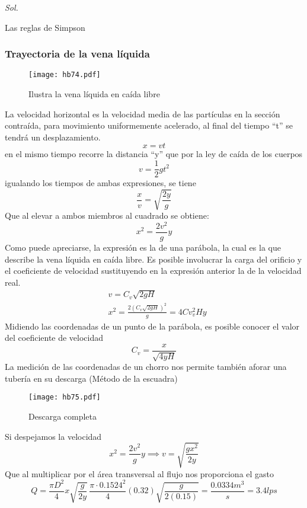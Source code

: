 \textit{ Sol. }

Las reglas de Simpson



\subsubsection{Trayectoria de la vena líquida}
\begin{figure}[h!]
\centering
  \texttt{[image: hb74.pdf]}
  \caption{Ilustra la vena líquida en caída libre}
  \label{hb74}
\end{figure}
La velocidad horizontal es la velocidad media de las partículas en la sección contraída, para movimiento uniformemente acelerado, al final del tiempo ``t'' se tendrá un desplazamiento.
\begin{equation*}
    x = vt
\end{equation*}
en el mismo tiempo recorre la distancia ``y'' que por la ley de caída de los cuerpos
\begin{equation*}
    v = \frac{1}{2}gt^2
\end{equation*}
igualando los tiempos de ambas expresiones, se tiene
\begin{equation*}
    \frac{x}{v} = \sqrt{\frac{2y}{g}}
\end{equation*}
Que al elevar a ambos miembros al cuadrado se obtiene:
\begin{equation*}
    x^2 = \frac{2v^2}{g}y
\end{equation*}
Como puede apreciarse, la expresión es la de una parábola, la cual es la que describe la vena líquida en caída libre. Es posible involucrar la carga del orificio y el coeficiente de velocidad sustituyendo en la expresión anterior la de la velocidad real.
\begin{align*}
    &v = C_v \sqrt{2gH}\\
    &x^2 = \frac{2\left(C_v \sqrt{2gH}\right)^2}{g} = 4Cv_v^2Hy
\end{align*}
Midiendo las coordenadas de un punto de la parábola, es posible conocer el valor del coeficiente de velocidad
\begin{equation}
    C_v = \frac{x}{\sqrt{4yH}}
\end{equation}
La medición de las coordenadas de un chorro nos permite también aforar una tubería en su descarga (Método de la escuadra)
\begin{figure}[h!]
\centering
  \texttt{[image: hb75.pdf]}
  \caption{Descarga completa}
  \label{hb75}
\end{figure}
Si despejamos la velocidad
\begin{equation*}
    x^2 = \frac{2v^2}{g}y\implies v = \sqrt{\frac{gx^2}{2y}}
\end{equation*}
Que al multiplicar por el área transversal al flujo nos proporciona el gasto
\begin{equation*}
    Q = \frac{\pi D^2}{4}x \sqrt{\frac{g}{2y}}\, \frac{\pi\cdot 0.1524^2}{4}(0.32) \sqrt{\frac{g}{2(0.15)}} =\frac{0.0334m^3}{s} = 3.4lps
\end{equation*}

